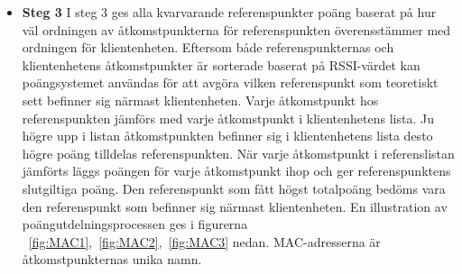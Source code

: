 \documentclass[a4paper,12pt]{article}
\begin{document}
\begin{itemize}
     \item \textbf{Steg 3}
     \newline
     I steg 3 ges alla kvarvarande referenspunkter poäng baserat på hur väl ordningen av åtkomstpunkterna för referenspunkten överensstämmer med ordningen för klientenheten. Eftersom både referenspunkternas och klientenhetens åtkomstpunkter är sorterade baserat på RSSI-värdet kan poängsystemet användas för att avgöra vilken referenspunkt som teoretiskt sett befinner sig närmast klientenheten.
     Varje åtkomstpunkt hos referenspunkten jämförs med varje åtkomstpunkt i klientenhetens lista. Ju högre upp i listan åtkomstpunkten befinner sig i klientenhetens lista desto högre poäng tilldelas referenspunkten. När varje åtkomstpunkt i referenslistan jämförts läggs poängen för varje åtkomstpunkt ihop och ger referenspunktens slutgiltiga poäng.
     Den referenspunkt som fått högst totalpoäng bedöms vara den referenspunkt som befinner sig närmast klientenheten.
     En illustration av poängutdelningsprocessen ges i figurerna ~\ref{fig:MAC1},~\ref{fig:MAC2},~\ref{fig:MAC3} nedan.
     MAC-adresserna är åtkomstpunkternas unika namn.


\end{itemize}
\end{document}
